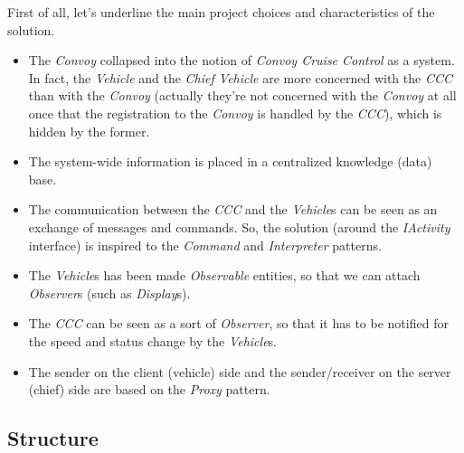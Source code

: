 \documentclass{llncs}
\begin{document}
First of all, let's underline the main project choices and characteristics of the solution.
\begin{itemize}
  \item The \emph{Convoy} collapsed into the notion of \emph{Convoy Cruise Control} as a system. In fact, the \emph{Vehicle} and the \emph{Chief Vehicle} are more concerned with the \emph{CCC} than with the \emph{Convoy} (actually they're not concerned with the \emph{Convoy} at all once that the registration to the \emph{Convoy} is handled by the \emph{CCC}), which is hidden by the former. \\

  \item The system-wide information is placed in a centralized knowledge (data) base.\\

  \item The communication between the \emph{CCC} and the \emph{Vehicle}s can be seen as an exchange of messages and commands. So, the solution (around the \emph{IActivity} interface) is inspired to the \emph{Command} and \emph{Interpreter} patterns.\\

  \item The \emph{Vehicle}s has been made \emph{Observable} entities, so that we can attach \emph{Observer}s (such as \emph{Display}s).\\

  \item The \emph{CCC} can be seen as a sort of \emph{Observer}, so that it has to be notified for the speed and status change by the \emph{Vehicle}s.\\

  \item The sender on the client (vehicle) side and the sender/receiver on the server (chief) side are based on the \emph{Proxy} pattern.
\end{itemize}

\newpage
\subsection{Structure}
\end{document}
